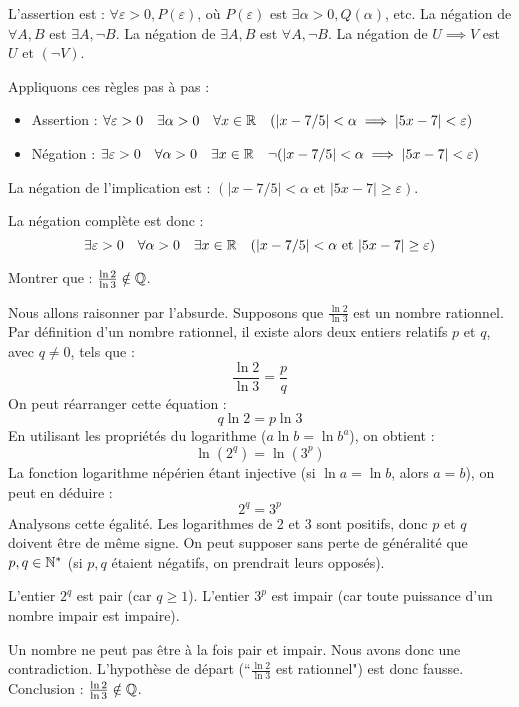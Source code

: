 \documentclass[solutions]{exercices}
\begin{document}
\begin{solution}
\begin{enumerate}
		      L'assertion est : $\forall \varepsilon > 0, P(\varepsilon)$, où $P(\varepsilon)$ est $\exists \alpha > 0, Q(\alpha)$, etc.
		      La négation de $\forall A, B$ est $\exists A, \neg B$.
		      La négation de $\exists A, B$ est $\forall A, \neg B$.
		      La négation de $U \implies V$ est $U \text{ et } (\neg V)$.

		      Appliquons ces règles pas à pas :
		      \begin{itemize}
			      \item Assertion : $\forall \varepsilon > 0 \quad \exists \alpha > 0 \quad \forall x \in \mathbb{R} \quad (|x - 7/5| < \alpha \implies |5x - 7| < \varepsilon)$
			      \item Négation : $\exists \varepsilon > 0 \quad \forall \alpha > 0 \quad \exists x \in \mathbb{R} \quad \neg(|x - 7/5| < \alpha \implies |5x - 7| < \varepsilon)$
		      \end{itemize}
		      La négation de l'implication est : $(|x - 7/5| < \alpha \text{ et } |5x - 7| \geq \varepsilon)$.

		      La négation complète est donc :
		      \[ \exists \varepsilon > 0 \quad \forall \alpha > 0 \quad \exists x \in \mathbb{R} \quad (|x - 7/5| < \alpha \text{ et } |5x - 7| \geq \varepsilon) \]
	\end{enumerate}
\end{solution}


\begin{exercice}
	Montrer que : $\frac{\ln 2}{\ln 3} \notin \mathbb{Q}$.
\end{exercice}

\begin{solution}
	Nous allons raisonner par l'absurde. Supposons que $\frac{\ln 2}{\ln 3}$ est un nombre rationnel.
	Par définition d'un nombre rationnel, il existe alors deux entiers relatifs $p$ et $q$, avec $q \neq 0$, tels que :
	\[ \frac{\ln 2}{\ln 3} = \frac{p}{q} \]
	On peut réarranger cette équation :
	\[ q \ln 2 = p \ln 3 \]
	En utilisant les propriétés du logarithme ($a \ln b = \ln b^a$), on obtient :
	\[ \ln(2^q) = \ln(3^p) \]
	La fonction logarithme népérien étant injective (si $\ln a = \ln b$, alors $a=b$), on peut en déduire :
	\[ 2^q = 3^p \]
	Analysons cette égalité. Les logarithmes de 2 et 3 sont positifs, donc $p$ et $q$ doivent être de même signe. On peut supposer sans perte de généralité que $p, q \in \mathbb{N}^*$ (si $p,q$ étaient négatifs, on prendrait leurs opposés).

	L'entier $2^q$ est pair (car $q \geq 1$).
	L'entier $3^p$ est impair (car toute puissance d'un nombre impair est impaire).

	Un nombre ne peut pas être à la fois pair et impair. Nous avons donc une contradiction.
	L'hypothèse de départ (``$\frac{\ln 2}{\ln 3}$ est rationnel") est donc fausse.
	Conclusion : $\frac{\ln 2}{\ln 3} \notin \mathbb{Q}$.
\end{solution}
\end{document}
